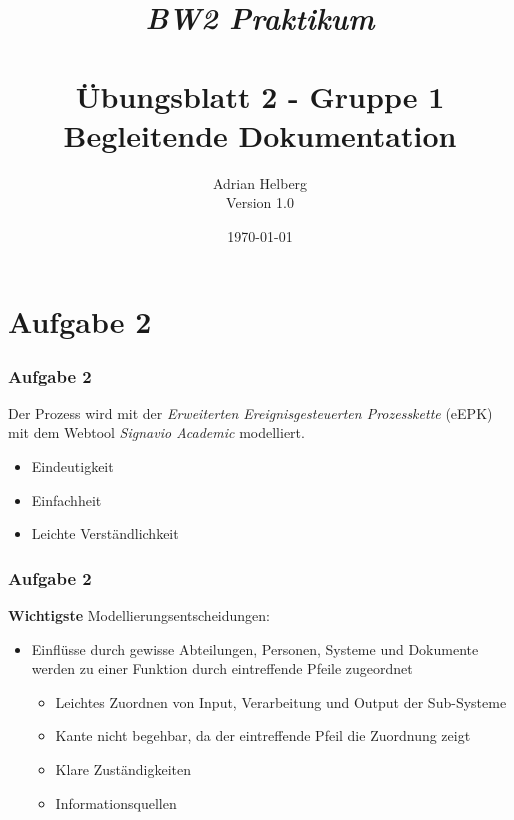 \documentclass{beamer}
\title{
	\textit{BW2 Praktikum} \\
	\textbf{\\ \"Ubungsblatt 2 - Gruppe 1\\
	\scriptsize{Begleitende Dokumentation}}
}
\author{Adrian Helberg \\ Version 1.0}
\date{\today}
\begin{document}

\maketitle

\section{Aufgabe 2}
\begin{frame}
\frametitle{Aufgabe 2}

Der Prozess wird mit der \textit{Erweiterten Ereignisgesteuerten Prozesskette} (eEPK)  mit dem Webtool \textit{Signavio Academic} modelliert.
\begin{itemize}
\setlength\itemsep{2em}
\item Eindeutigkeit
\item Einfachheit 
\item Leichte Verständlichkeit
\end{itemize}

\end{frame}

\begin{frame}
\frametitle{Aufgabe 2}

\textbf{Wichtigste} Modellierungsentscheidungen:\\
\begin{itemize}
\item Einfl\"usse durch gewisse Abteilungen, Personen, Systeme und Dokumente werden zu einer Funktion durch eintreffende Pfeile zugeordnet
	\begin{itemize}
	\setlength\itemsep{1em}
	\item Leichtes Zuordnen von Input, Verarbeitung und Output der Sub-Systeme
	\item Kante nicht begehbar, da der eintreffende Pfeil die Zuordnung zeigt
	\item Klare Zust\"andigkeiten
	\item Informationsquellen
	\end{itemize}
\end{itemize}

\end{frame}
\end{document}
